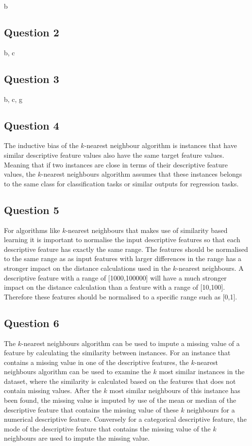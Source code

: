 \documentclass[10pt]{article}
\begin{document}
b

\subsection*{Question 2}

b, c

\subsection*{Question 3}

b, c, g

\subsection*{Question 4}

The inductive bias of the $k$-nearest neighbour algorithm is instances that have similar descriptive feature values
also have the same target feature values. Meaning that if two instances are close in terms of their descriptive feature
values, the $k$-nearest neighbours algorithm assumes that these instances belongs to the same class for classification tasks
or similar outputs for regression tasks.

\subsection*{Question 5}

For algorithms like $k$-nearest neighbours that makes use of similarity based learning it is important to
normalise the input descriptive features so that each descriptive feature has exactly the same range. The
features should be normalised to the same range as as input features with larger differences in the range
has a stronger impact on the distance calculations used in the $k$-nearest neighbours. A descriptive
feature with a range of [1000,100000] will have a much stronger impact on the distance calculation
than a feature with a range of [10,100]. Therefore these features should be normalised to a specific
range such as [0,1].

\subsection*{Question 6}

The $k$-nearest neighbours algorithm can be used to impute a missing value of a feature by calculating the
similarity between instances. For an instance that contains a missing value in one of the descriptive
features, the $k$-nearest neighbours algorithm can be used to examine the $k$ most similar instances
in the dataset, where the similarity is calculated based on the features that does not contain missing values.
After the $k$ most similar neighbours of this instance has been found, the missing value is imputed by use of
the mean or median of the descriptive feature that contains the missing value of these $k$ neighbours for a numerical
descriptive feature. Conversely for a categorical descriptive feature, the mode of the descriptive feature that contains
the missing value of the $k$ neighbours are used to impute the missing value.
\end{document}
